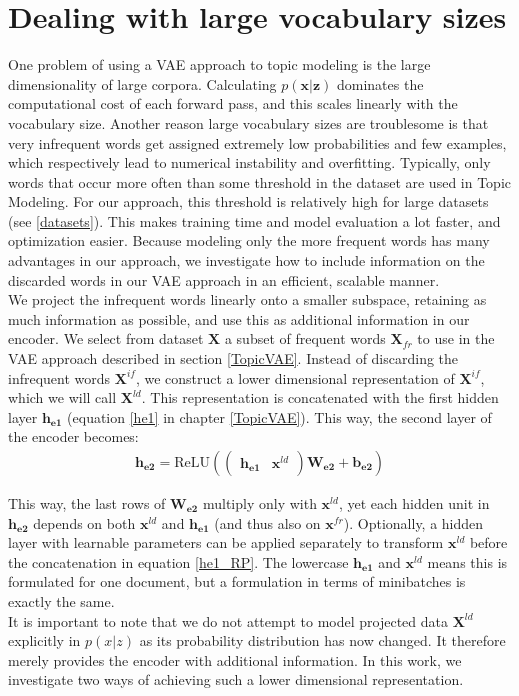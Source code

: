 \documentclass{report}
\begin{document}
\section{Dealing with large vocabulary sizes}
One problem of using a VAE approach to topic modeling is the large dimensionality of large corpora. Calculating $p(\mathbf{x}|\mathbf{z})$ dominates the computational cost of each forward pass, and this scales linearly with the vocabulary size. Another reason large vocabulary sizes are troublesome is that very infrequent words get assigned extremely low probabilities and few examples, which respectively lead to numerical instability and overfitting. Typically, only words that occur more often than some threshold in the dataset are used in Topic Modeling. For our approach, this threshold is relatively high for large datasets (see \ref{datasets}). This makes training time and model evaluation a lot faster, and optimization easier. 
Because modeling only the more frequent words has many advantages in our approach, we investigate how to include information on the discarded words in our VAE approach in an efficient, scalable manner.
\\
We project the infrequent words linearly onto a smaller subspace, retaining as much information as possible, and use this as additional information in our encoder. We select from dataset $\mathbf{X}$ a subset of frequent words $\mathbf{X}_{fr}$ to use in the VAE approach described in section \ref{TopicVAE}. Instead of discarding the infrequent words $\mathbf{X}^{if}$, we construct a lower dimensional representation of $\mathbf{X}^{if}$, which we will call $\mathbf{X}^{ld}$. This representation is concatenated with the first hidden layer $\mathbf{h_{e1}}$ (equation \ref{he1} in chapter \ref{TopicVAE}). This way, the second layer of the encoder becomes:
\begin{align}
\mathbf{h_{e2}} = \text{ReLU}(\left(\begin{matrix}
\mathbf{h_{e1}} &
\mathbf{x}^{ld}
\end{matrix}\right)\mathbf{W_{e2}} + \mathbf{b_{e2}}) \label{he1_RP}
\end{align}

This way, the last rows of $\mathbf{W_{e2}}$ multiply only with $\mathbf{x}^{ld}$, yet each hidden unit in $\mathbf{h_{e2}}$ depends on both $\mathbf{x}^{ld}$ and $\mathbf{h_{e1}}$ (and thus also on $\mathbf{x}^{fr}$). Optionally, a hidden layer with learnable parameters can be applied separately to transform $\mathbf{x}^{ld}$ before the concatenation in equation \ref{he1_RP}. The lowercase $\mathbf{h_{e1}}$ and $\mathbf{x}^{ld}$ means this is formulated for one document, but a formulation in terms of minibatches is exactly the same.\\
It is important to note that we do not attempt to model projected data $\mathbf{X}^{ld}$ explicitly in $p(x|z)$  as its probability distribution has now changed.  It therefore merely provides the encoder with additional information. In this work, we investigate two ways of achieving such a lower dimensional representation. 
\end{document}
